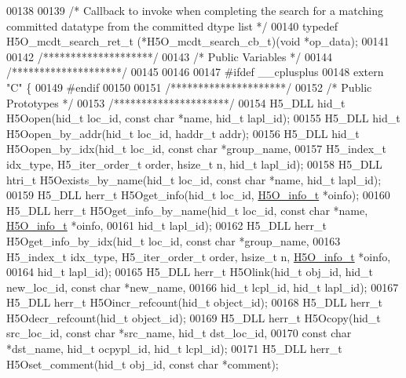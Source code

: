 \begin{DoxyCode}
00138 
00139 \textcolor{comment}{/* Callback to invoke when completing the search for a matching committed datatype from the committed dtype
       list */}
00140 \textcolor{keyword}{typedef} H5O\_mcdt\_search\_ret\_t (*H5O\_mcdt\_search\_cb\_t)(\textcolor{keywordtype}{void} *op\_data);
00141 
00142 \textcolor{comment}{/********************/}
00143 \textcolor{comment}{/* Public Variables */}
00144 \textcolor{comment}{/********************/}
00145 
00146 
00147 \textcolor{preprocessor}{#ifdef \_\_cplusplus}
00148 \textcolor{keyword}{extern} \textcolor{stringliteral}{"C"} \{
00149 \textcolor{preprocessor}{#endif}
00150 
00151 \textcolor{comment}{/*********************/}
00152 \textcolor{comment}{/* Public Prototypes */}
00153 \textcolor{comment}{/*********************/}
00154 H5\_DLL hid\_t H5Oopen(hid\_t loc\_id, \textcolor{keyword}{const} \textcolor{keywordtype}{char} *name, hid\_t lapl\_id);
00155 H5\_DLL hid\_t H5Oopen\_by\_addr(hid\_t loc\_id, haddr\_t addr);
00156 H5\_DLL hid\_t H5Oopen\_by\_idx(hid\_t loc\_id, \textcolor{keyword}{const} \textcolor{keywordtype}{char} *group\_name,
00157     H5\_index\_t idx\_type, H5\_iter\_order\_t order, hsize\_t n, hid\_t lapl\_id);
00158 H5\_DLL htri\_t H5Oexists\_by\_name(hid\_t loc\_id, \textcolor{keyword}{const} \textcolor{keywordtype}{char} *name, hid\_t lapl\_id);
00159 H5\_DLL herr\_t H5Oget\_info(hid\_t loc\_id, \hyperlink{struct_h5_o__info__t}{H5O\_info\_t} *oinfo);
00160 H5\_DLL herr\_t H5Oget\_info\_by\_name(hid\_t loc\_id, \textcolor{keyword}{const} \textcolor{keywordtype}{char} *name, \hyperlink{struct_h5_o__info__t}{H5O\_info\_t} *oinfo,
00161     hid\_t lapl\_id);
00162 H5\_DLL herr\_t H5Oget\_info\_by\_idx(hid\_t loc\_id, \textcolor{keyword}{const} \textcolor{keywordtype}{char} *group\_name,
00163     H5\_index\_t idx\_type, H5\_iter\_order\_t order, hsize\_t n, \hyperlink{struct_h5_o__info__t}{H5O\_info\_t} *oinfo,
00164     hid\_t lapl\_id);
00165 H5\_DLL herr\_t H5Olink(hid\_t obj\_id, hid\_t new\_loc\_id, \textcolor{keyword}{const} \textcolor{keywordtype}{char} *new\_name,
00166     hid\_t lcpl\_id, hid\_t lapl\_id);
00167 H5\_DLL herr\_t H5Oincr\_refcount(hid\_t object\_id);
00168 H5\_DLL herr\_t H5Odecr\_refcount(hid\_t object\_id);
00169 H5\_DLL herr\_t H5Ocopy(hid\_t src\_loc\_id, \textcolor{keyword}{const} \textcolor{keywordtype}{char} *src\_name, hid\_t dst\_loc\_id,
00170     \textcolor{keyword}{const} \textcolor{keywordtype}{char} *dst\_name, hid\_t ocpypl\_id, hid\_t lcpl\_id);
00171 H5\_DLL herr\_t H5Oset\_comment(hid\_t obj\_id, \textcolor{keyword}{const} \textcolor{keywordtype}{char} *comment);

\end{DoxyCode}
